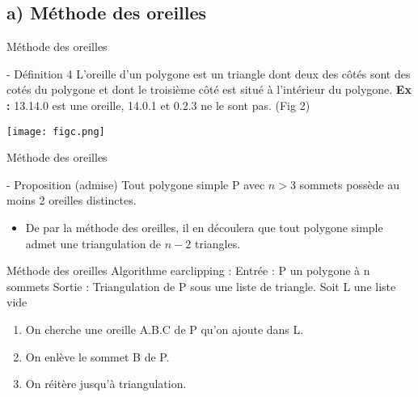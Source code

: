 \documentclass{beamer}
\begin{document}
\subsection{a) Méthode des oreilles}
\begin{frame}{Méthode des oreilles}
    \begin{block}{- Définition 4}
      L'oreille d'un polygone est un triangle dont deux des côtés sont des cotés du polygone et dont le troisième côté est situé à l’intérieur du polygone.\newline
      \textbf{Ex :} 13.14.0 est une oreille, 14.0.1 et 0.2.3 ne le sont pas. (Fig 2)
    \end{block}
    \begin{center}
        \texttt{[image: figc.png]}
    \end{center}
\end{frame}
\begin{frame}{Méthode des oreilles}
\begin{center}
    \begin{block}{- Proposition (admise)}
        Tout polygone simple P avec $n > 3$ sommets possède au moins 2 oreilles distinctes. \newline\newline
    \end{block}
    \begin{itemize}
        \item  De par la méthode des oreilles, il en découlera que tout polygone simple admet une triangulation de $n-2$ triangles.
    \end{itemize}
\end{center}
\end{frame}
\begin{frame}{Méthode des oreilles}
    Algorithme earclipping : \newline\newline
    Entrée : P un polygone à n sommets \newline
    Sortie : Triangulation de P sous une liste de triangle. \newline\newline
    Soit L une liste vide 
    \begin{enumerate}
        \item <1 -> On cherche une oreille A.B.C  de P qu'on ajoute dans L.
        \item <2 -> On enlève le sommet B de P.
        \item <3 -> On réitère jusqu'à triangulation.
    \end{enumerate}   
\end{frame}
\end{document}
